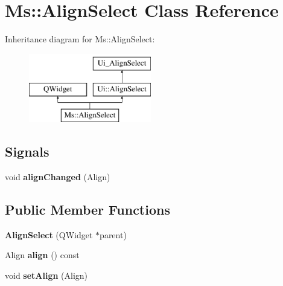 \hypertarget{class_ms_1_1_align_select}{}\section{Ms\+:\+:Align\+Select Class Reference}
\label{class_ms_1_1_align_select}
Inheritance diagram for Ms\+:\+:Align\+Select\+:\begin{figure}[H]
\begin{center}
\leavevmode
\includegraphics[height=3.000000cm]{class_ms_1_1_align_select}
\end{center}
\end{figure}
\subsection*{Signals}
\begin{DoxyCompactItemize}
\item 
\mbox{\label{class_ms_1_1_align_select_a5f2f88fbe649ccc1c7283befed55c2e0}} 
void {\bfseries align\+Changed} (Align)
\end{DoxyCompactItemize}
\subsection*{Public Member Functions}
\begin{DoxyCompactItemize}
\item 
\mbox{\label{class_ms_1_1_align_select_a5228f87eb512eb992cb524ca41563418}} 
{\bfseries Align\+Select} (Q\+Widget $\ast$parent)
\item 
\mbox{\label{class_ms_1_1_align_select_a69a56c6e5b5de54c180f72cea046285d}} 
Align {\bfseries align} () const
\item 
\mbox{\label{class_ms_1_1_align_select_ac18f71dba446c97dd8cb4e85ead09620}} 
void {\bfseries set\+Align} (Align)
\end{DoxyCompactItemize}

